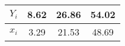 \begin{tabular}{|c|c|c|c|}
\hline
$Y_i$ & 8.62 & 26.86 & 54.02 \\
\hline
$x_i$ & 3.29 & 21.53 & 48.69 \\
\hline
\end{tabular}